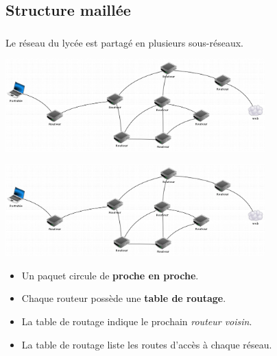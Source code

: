 \documentclass[svgnames,11pt]{beamer}
\begin{document}
\subsection{Structure maillée}
\begin{frame}
    \frametitle{}
    Le réseau du lycée est partagé en plusieurs sous-réseaux.
    \begin{center}
        \centering
        \includegraphics[width=10cm]{ressources/reseau.png}
        \label{reseau}
    \end{center}
\end{frame}
\begin{frame}
    \includegraphics[width=10cm]{ressources/reseau.png}
    \begin{itemize}
        \item<1->Un paquet circule de \textbf{proche en proche}.
        \item<2-> Chaque routeur possède une \textbf{table de routage}.
        \item <3->La table de routage indique le prochain \emph{routeur voisin}.
        \item <4->La table de routage liste les routes d'accès à chaque réseau.
    \end{itemize}
\end{frame}
\end{document}
